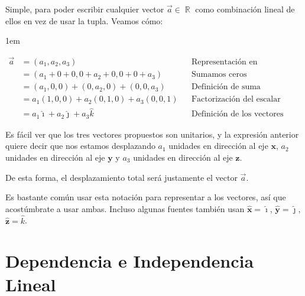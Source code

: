 \documentclass[12pt, fleqn]{report}                             %
\newenvironment{SmallIndentation}[1][0.75em]                    %
        {\begin{adjustwidth}{#1}{}\begin{footnotesize}}             %
        {\end{footnotesize}\end{adjustwidth}}                       %
\theoremstyle{break}                                            %
\DeclareMathOperator \Reals        {\mathbb{R}}                 %
\newcommand{\hati} {\hat{\imath}}                               %
\newcommand{\hatj} {\hat{\jmath}}                               %
\newcommand{\hatk} {\hat{k}}                                    %
\newcommand{\uVec}[1]{\mathbf{\hat{#1}}}                        %
\begin{document}
                    Simple, para poder escribir cualquier vector $\vec{a} \in \Reals$ como combinación
                    lineal de ellos en vez de usar la tupla.
                    Veamos cómo:
                    \begin{SmallIndentation}[1em]
                        \begin{align*}
                            \vec{a}
                                &= (a_1, a_2, a_3)                               &&\mbox{Representación en coordenadas}        \\
                                &= (a_1 + 0 + 0, 0 + a_2 + 0, 0 + 0 + a_3)       &&\mbox{Sumamos ceros convenientemente}       \\
                                &= (a_1, 0, 0) + (0, a_2, 0) + (0, 0, a_3)       &&\mbox{Definición de suma}                   \\
                                &= a_1(1, 0, 0) + a_2(0, 1, 0) + a_3(0, 0, 1)    &&\mbox{Factorización del escalar}            \\
                                &= a_1\hati + a_2\hatj + a_3\hatk          &&\mbox{Definición de los vectores canónicos}
                        \end{align*}
                    \end{SmallIndentation}
                
                    Es fácil ver que los tres vectores propuestos son unitarios, y la expresión anterior
                    quiere decir que nos estamos desplazando $a_1$ unidades en dirección al eje $\mathbf{x}$,
                    $a_2$ unidades en dirección al eje $\mathbf{y}$ y $a_3$ unidades en dirección al eje
                    $\mathbf{z}$.

                    De esta forma, el desplazamiento total será justamente el vector $\vec{a}$.
                    
                    Es bastante común usar esta notación para representar a los vectores, así que acostúmbrate a usar ambas. 
                    Incluso algunas fuentes también usan $\uVec{x} = \hati$, $\uVec{y} = \hatj$, $\uVec{z} = \hatk$.




        \clearpage
        \section{Dependencia e Independencia Lineal}
            
\end{document}
